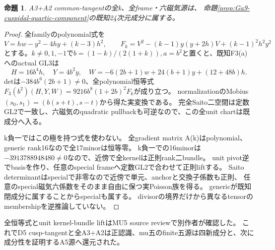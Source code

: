 \documentclass[a4paper,11pt]{ltjsarticle}
\newtheorem{proposition}{命題}[section]
\theoremstyle{definition}
\begin{document}
\begin{proposition}\label{prop:marked-quartic-A3A2-all-source-cuspidal}
A3+A2 common-tangentの全k、全frame・六磁気源は、
命題\ref{prop:Ga9-cuspidal-quartic-component}の既知24次元成分に属する。
\end{proposition}
\begin{proof}
全familyのpolynomial式を
\[
 V=hw-y^2-4hy+(k-3)h^2,\qquad
 F_k=V^2-(k-1)y(y+2h)V+(k-1)^2h^2y^2
\]
とする。$k\ne0,1,-1$で$b=(1-k)/(2(1+k)),a=b^2$と置くと、既知F3(a)へのactual GL3は
\[
 H=16b^4h,\quad Y=4b^2y,\quad
 W=-6(2b+1)w+24(b+1)y+(12+48b)h.
\]
detは$-384b^6(2b+1)\ne0$、全polynomial恒等式
$F_3(b^2)(H,Y,W)=9216b^8(1+2b)^2F_k$が成り立つ。
normalizationのMobius$(s_0,s_1)=(b(s+t),s-t)$から得た実変換である。
完全Saito二空間は定数GL2で一致し、六磁気のquadratic pullbackも可逆なので、この全unit chartは既成分へ入る。

k負一ではこの極を持つ式を使わない。
全gradient matrix A(k)はpolynomial、generic rank16なので全17minorは恒等零。
k負一での16minorは$-3913788948480\ne0$なので、近傍で全kernelは正則rank二bundle。
unit pivot逆でbasisを作り、任意のspecial frameへ定数GL2で合わせて正則liftする。
Saito determinantはspecialで非零なので近傍で単元、anchorと交換子係数も正則、
任意のspecial磁気六係数をそのまま自由に保つ実Poisson族を得る。
genericが既知閉成分に属することからspecialも属する。
divisorの境界だけから異なるtensorのmembershipを逆推論していない。
\end{proof}
全恒等式とunit kernel-bundle liftはMU5 source reviewで別作者が確認した。
これでD5 cusp-tangentと全A3+A2は正認識、mu五のfinite五源は四新成分と、次に成分性を証明するA5源へ還元された。
\end{document}
